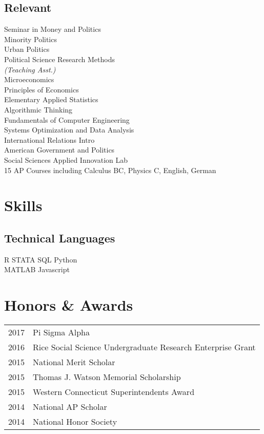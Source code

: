 \documentclass[]{ajk-resume}
\begin{document}
\begin{minipage}[t]{0.33\textwidth}
\subsection{Relevant}
Seminar in Money and Politics \\
Minority Politics \\
Urban Politics \\
Political Science Research Methods \\
\hspace{35mm} {\footnotesize \textit{(Teaching Asst.)}} \\
Microeconomics \\
Principles of Economics \\
Elementary Applied Statistics \\
Algorithmic Thinking \\
Fundamentals of Computer Engineering  \\
Systems Optimization and Data Analysis \\
International Relations Intro \\
American Government and Politics \\
Social Sciences Applied Innovation Lab \\
\hangindent=10.4mm 15 AP Courses including Calculus BC, Physics C, English, German
\sectionsep


\section{Skills}
\subsection{Technical Languages}
R \textbullet{}   STATA \textbullet{} SQL \textbullet{} Python \\
MATLAB \textbullet{} Javascript
\sectionsep

\section{Honors \& Awards} 
\begin{tabular}{l p{4.2cm}}
2017 & Pi Sigma Alpha \\
2016 & Rice Social Science Undergraduate Research Enterprise Grant \\
2015 & National Merit Scholar \\ 
2015 & Thomas J. Watson Memorial Scholarship \\
2015 & Western Connecticut Superintendents Award \\ 
2014 & National AP Scholar \\ 
2014 & National Honor Society
\end{tabular}
\sectionsep


%
%

\end{minipage} 
\end{document}
